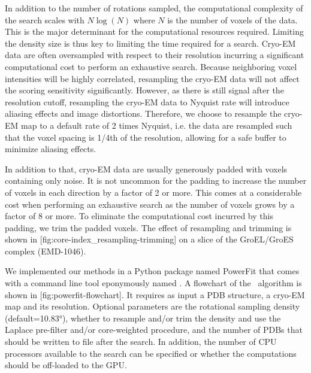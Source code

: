 In addition to the number of rotations sampled, the computational complexity of
the search scales with $N \log\left( N \right)$ where $N$ is the number of
voxels of the data.
This is the major determinant for the computational resources required.
Limiting the density size is thus key to limiting the time required for a
search. Cryo-EM data are often oversampled with respect to their resolution
incurring a significant computational cost to perform an exhaustive search.
Because neighboring voxel intensities will be highly correlated, resampling the
cryo-EM data will not affect the scoring sensitivity significantly. However, as
there is still signal after the resolution cutoff, resampling the cryo-EM data
to Nyquist rate will introduce aliasing effects and image distortions.
Therefore, we choose to resample the cryo-EM map to a default rate of 2 times
Nyquist, i.e. the data are resampled such that the voxel spacing is 1/4th of
the resolution, allowing for a safe buffer to minimize aliasing effects. 

In addition to that, cryo-EM data are usually generously padded with voxels
containing only noise. It is not uncommon for the padding to increase the
number of voxels in each direction by a factor of 2 or more. This comes at a
considerable cost when performing an exhaustive search as the number of voxels
grows by a factor of 8 or more. To eliminate the computational cost incurred by
this padding, we trim the padded voxels. The effect of resampling and trimming
is shown in [fig:core-index_resampling-trimming] on a slice of
the GroEL/GroES complex (EMD-1046). 


We implemented our methods in a Python package named PowerFit that comes with a
command line tool eponymously named \powerfit. A flowchart of the \powerfit\
algorithm is shown in [fig:powerfit-flowchart]. It requires as input
a PDB structure, a cryo-EM map and its resolution. Optional parameters are the
rotational sampling density (default=10.83°), whether to resample and/or trim
the density and use the Laplace pre-filter and/or core-weighted procedure, and
the number of PDBs that should be written to file after the search. In
addition, the number of CPU processors available to the search can be specified
or whether the computations should be off-loaded to the GPU. 

{}

